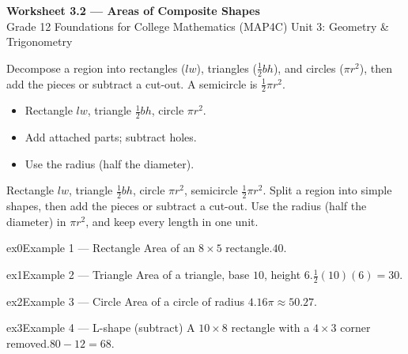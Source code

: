 \documentclass[11pt]{article}
\begin{document}
\begin{center}
{\LARGE\bfseries\color{titleblue}Worksheet 3.2 --- Areas of Composite Shapes}\\[2pt]
{\small Grade 12 Foundations for College Mathematics (MAP4C) \textperiodcentered{} Unit 3: Geometry \& Trigonometry}
\end{center}

\begin{ideabox}
Decompose a region into rectangles ($lw$), triangles ($\tfrac12bh$), and circles ($\pi r^2$), then add the pieces or subtract a cut-out. A semicircle is $\tfrac12\pi r^2$.
\begin{itemize}[leftmargin=*,itemsep=2pt]
  \item Rectangle $lw$, triangle $\tfrac12bh$, circle $\pi r^2$.
  \item Add attached parts; subtract holes.
  \item Use the radius (half the diameter).
\end{itemize}
\end{ideabox}

\begin{learnbox}
Rectangle $lw$, triangle $\tfrac12bh$, circle $\pi r^2$, semicircle $\tfrac12\pi r^2$.
Split a region into simple shapes, then add the pieces or subtract a cut-out.
Use the radius (half the diameter) in $\pi r^2$, and keep every length in one unit.
\end{learnbox}


\begin{example}{ex0}{Example 1 --- Rectangle}
Area of an $8\times5$ rectangle.\soln $40$.
\end{example}

\begin{example}{ex1}{Example 2 --- Triangle}
Area of a triangle, base $10$, height $6$.\soln $\tfrac12(10)(6)=30$.
\end{example}

\begin{example}{ex2}{Example 3 --- Circle}
Area of a circle of radius $4$.\soln $16\pi\approx50.27$.
\end{example}

\begin{example}{ex3}{Example 4 --- L-shape (subtract)}
A $10\times8$ rectangle with a $4\times3$ corner removed.\soln $80-12=68$.
\end{example}
\end{document}
